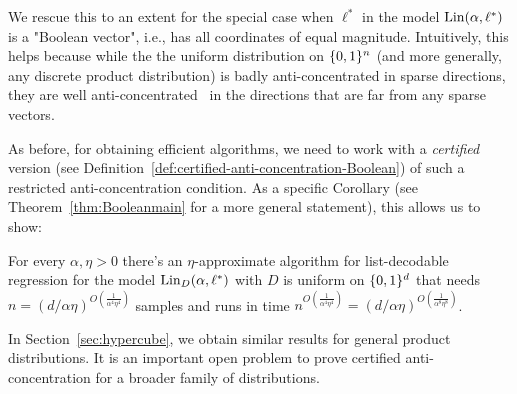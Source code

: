 We rescue this to an extent for the special case when $\ell^*$ in the model $\mathrm{Lin}(\alpha,\ell^*)$ is a "Boolean vector", i.e., has all coordinates of equal magnitude. Intuitively, this helps because  while the the uniform distribution on $\{0,1\}^n$ (and more generally, any discrete product distribution) is badly anti-concentrated in sparse directions, they are well anti-concentrated~\cite{ErdosLittlewoodOfford} in the directions that are far from any sparse vectors. 

As before, for obtaining efficient algorithms, we need to work with a \emph{certified} version (see Definition~\ref{def:certified-anti-concentration-Boolean}) of such a restricted anti-concentration condition. As a specific Corollary (see Theorem~\ref{thm:Booleanmain} for a more general statement), this allows us to show:
\begin{theorem} \label{thm:boolcube}
For every $\alpha, \eta > 0$ there's an $\eta$-approximate algorithm for list-decodable regression for the model $\mathrm{Lin}_D(\alpha,\ell^*)$ with $D$ is uniform on $\{0,1\}^d$ that needs $n = (d/\alpha \eta)^{O(\frac{1}{\alpha^4 \eta^4})}$  samples and runs in time $n^{O(\frac{1}{\alpha^4 \eta^4})} = (d/\alpha \eta)^{O(\frac{1}{\alpha^8 \eta^8})}$.
\end{theorem} 

In Section~\ref{sec:hypercube}, we obtain similar results for general product distributions. It is an important open problem to prove certified anti-concentration for a broader family of distributions. %


